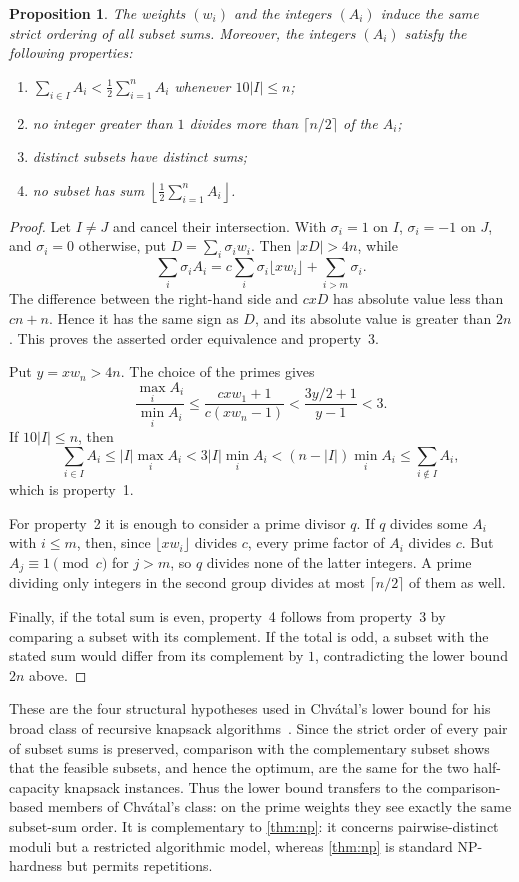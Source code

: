 \documentclass[a4paper,11pt]{article}
\newtheorem{proposition}[question]{Proposition}
\newcommand{\abs}[1]{\lvert#1\rvert}
\begin{document}
\begin{proposition}\label{prop:chvatal}
The weights $(w_i)$ and the integers $(A_i)$ induce the same strict ordering
of all subset sums.  Moreover, the integers $(A_i)$ satisfy the following
properties:
\begin{enumerate}
 \item $\sum_{i\in I}A_i<\frac12\sum_{i=1}^n A_i$ whenever
       $10\abs I\leq n$;
 \item no integer greater than $1$ divides more than $\lceil n/2\rceil$ of
       the $A_i$;
 \item distinct subsets have distinct sums;
 \item no subset has sum $\left\lfloor\frac12\sum_{i=1}^nA_i\right\rfloor$.
\end{enumerate}
\end{proposition}

\begin{proof}
Let $I\neq J$ and cancel their intersection.  With
$\sigma_i=1$ on $I$, $\sigma_i=-1$ on $J$, and $\sigma_i=0$ otherwise, put
$D=\sum_i\sigma_iw_i$.  Then $\abs{xD}>4n$, while
\[
 \sum_i\sigma_iA_i
 =c\sum_i\sigma_i\lfloor xw_i\rfloor
   +\sum_{i>m}\sigma_i.
\]
The difference between the right-hand side and $cxD$ has absolute value less
than $cn+n$.  Hence it has the same sign as $D$, and its absolute value is
greater than $2n$.  This proves the asserted order equivalence and property~3.

Put $y=xw_n>4n$.  The choice of the primes gives
\[
 \frac{\max_i A_i}{\min_i A_i}
 \leq\frac{cxw_1+1}{c(xw_n-1)}
 <\frac{3y/2+1}{y-1}<3.
\]
If $10\abs I\leq n$, then
\[
 \sum_{i\in I}A_i
 \leq\abs I\max_iA_i
 <3\abs I\min_iA_i
 <(n-\abs I)\min_iA_i
 \leq\sum_{i\notin I}A_i,
\]
which is property~1.

For property~2 it is enough to consider a prime divisor $q$.  If $q$ divides
some $A_i$ with $i\leq m$, then, since
$\lfloor xw_i\rfloor$ divides $c$, every prime factor of $A_i$ divides $c$.
But $A_j\equiv1\pmod c$ for $j>m$, so $q$ divides none of the latter
integers.  A prime dividing only integers in the second group divides at most
$\lceil n/2\rceil$ of them as well.

Finally, if the total sum is even, property~4 follows from property~3 by
comparing a subset with its complement.  If the total is odd, a subset with
the stated sum would differ from its complement by $1$, contradicting the
lower bound $2n$ above.
\end{proof}

These are the four structural hypotheses used in Chv\'atal's lower bound for
his broad class of recursive knapsack algorithms~\cite[Theorem~1]{Chvatal80}.
Since the strict order of every pair of subset sums is preserved, comparison
with the complementary subset shows that the feasible subsets, and hence the
optimum, are the same for the two half-capacity knapsack instances.  Thus the
lower bound transfers to the comparison-based members of Chv\'atal's class:
on the prime weights they see exactly the same subset-sum order.  It is
complementary to
\cref{thm:np}: it concerns pairwise-distinct moduli but a restricted algorithmic
model, whereas \cref{thm:np} is standard NP-hardness but permits repetitions.
\end{document}
